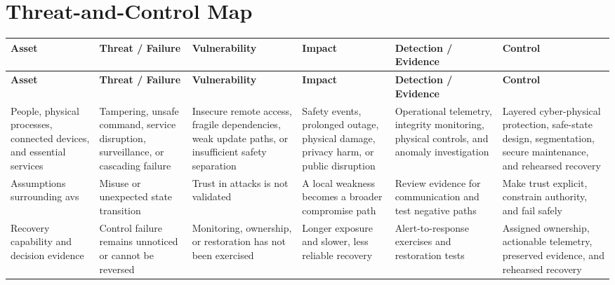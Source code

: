 \documentclass[11pt,letterpaper]{article}
\begin{document}
\section*{Threat-and-Control Map}
\begingroup\scriptsize\setlength{\tabcolsep}{2pt}
\begin{longtable}{>{\raggedright\arraybackslash}p{}>{\raggedright\arraybackslash}p{}>{\raggedright\arraybackslash}p{}>{\raggedright\arraybackslash}p{}>{\raggedright\arraybackslash}p{}>{\raggedright\arraybackslash}p{}}
\toprule\rowcolor{Navy}\color{white}\textbf{Asset} & \color{white}\textbf{Threat / Failure} & \color{white}\textbf{Vulnerability} & \color{white}\textbf{Impact} & \color{white}\textbf{Detection / Evidence} & \color{white}\textbf{Control}\\\midrule
\endfirsthead
\toprule\rowcolor{Navy}\color{white}\textbf{Asset} & \color{white}\textbf{Threat / Failure} & \color{white}\textbf{Vulnerability} & \color{white}\textbf{Impact} & \color{white}\textbf{Detection / Evidence} & \color{white}\textbf{Control}\\\midrule
\endhead
People, physical processes, connected devices, and essential services & Tampering, unsafe command, service disruption, surveillance, or cascading failure & Insecure remote access, fragile dependencies, weak update paths, or insufficient safety separation & Safety events, prolonged outage, physical damage, privacy harm, or public disruption & Operational telemetry, integrity monitoring, physical controls, and anomaly investigation & Layered cyber-physical protection, safe-state design, segmentation, secure maintenance, and rehearsed recovery\\\midrule
Assumptions surrounding avs & Misuse or unexpected state transition & Trust in attacks is not validated & A local weakness becomes a broader compromise path & Review evidence for communication and test negative paths & Make trust explicit, constrain authority, and fail safely\\\midrule
Recovery capability and decision evidence & Control failure remains unnoticed or cannot be reversed & Monitoring, ownership, or restoration has not been exercised & Longer exposure and slower, less reliable recovery & Alert-to-response exercises and restoration tests & Assigned ownership, actionable telemetry, preserved evidence, and rehearsed recovery\\\midrule
\bottomrule
\end{longtable}
\endgroup
\end{document}
